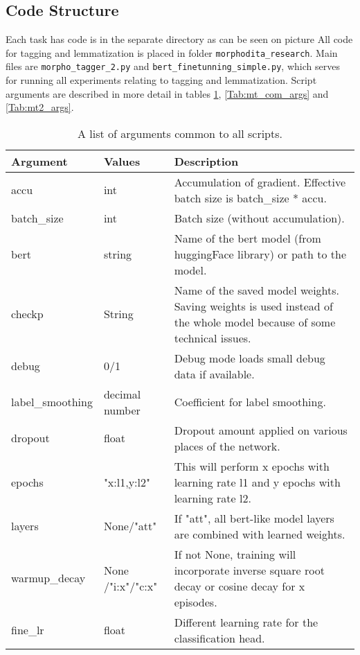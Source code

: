 \subsection{Code Structure}
Each task has code is in the separate directory as can be seen on picture %
All code for tagging and lemmatization is placed in folder \texttt{morphodita\_research}. Main files are \texttt{morpho\_tagger\_2.py} and \texttt{bert\_finetunning\_simple.py}, which serves for running all experiments relating to tagging and lemmatization. Script arguments are described in more detail in tables \ref{Tab:com_args}, \ref{Tab:mt_com_args} and \ref{Tab:mt2_args}.

\begin{table}
\centering
\begin{tabular}{ |p{3cm}|p{}|p{6cm}| } 
 \hline
 Argument & Values & Description \\ 
 \hline \hline
 accu & int & Accumulation of gradient. Effective batch size is batch\_size * accu.  \\\hline
batch\_size & int & Batch size (without accumulation). \\ \hline
bert & string & Name of the bert model (from huggingFace library) or path to the model.  \\ \hline
  checkp & String & Name of the saved model weights. Saving weights is used instead of the whole model because of some technical issues.  \\ \hline
  debug & 0/1 & Debug mode loads small debug data if available. \\ \hline
  label\_smoothing & decimal number & Coefficient for label smoothing. \\ \hline
  dropout & float &  Dropout amount applied on various places of the network.  \\ \hline
 epochs & "x:l1,y:l2"  & This will perform x epochs with learning rate l1 and y epochs with learning rate l2.   \\ \hline
 layers & None/"att" & If "att", all bert-like model layers are combined with learned weights.  \\ \hline
 warmup\_decay & None /"i:x"/"c:x" & If not None, training will incorporate inverse square root decay or cosine decay for x episodes.  \\ \hline
 fine\_lr & float & Different learning rate for the classification head.  \\ \hline
 \hline
\end{tabular}
\caption{A list of arguments common to all scripts.} 
\label{Tab:com_args}
\end{table}


